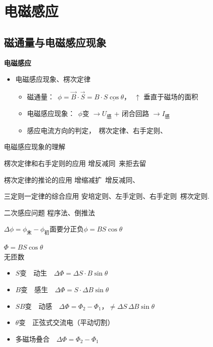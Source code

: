 \chapter{电磁感应}
\label{ch:12}

\section{磁通量与电磁感应现象}
\textbf{电磁感应}

\begin{itemize}
\item 电磁感应现象、楞次定律
 \begin{itemize}
 \item 磁通量：\ $\phi=\vec B\cdot\vec S=B\cdot\underline{S\cos\theta}$，\ $\uparrow$ 垂直于磁场的面积
 \item 电磁感应现象：\ $\phi$变 $\to U_{\text{感}}$ + 闭合回路 $\to I_{\text{感}}$
 \item 感应电流方向的判定，\ 楞次定律、右手定则、
 \end{itemize}
\end{itemize}

电磁感应现象的理解

楞次定律和右手定则的应用 \quad 增反减同\ 来拒去留

楞次定律的推论的应用 \quad 增缩减扩\ 增反减同、

三定则一定律的综合应用 \quad 安培定则、左手定则、右手定则\ 楞次定则.

二次感应问题 \quad 程序法、倒推法

$\Delta\phi=\phi_{\text{末}}-\phi_{\text{初}}$\qquad 面要分正负\qquad $\phi=BS\cos\theta$


\begin{center}
$\Phi=BS\cos\theta$\\
无匝数
\end{center}
\begin{itemize}
  \item $S$变　动生　$\Delta\Phi=\Delta S\cdot B\sin\theta$
  \item $B$变　感生　$\Delta\Phi=S\cdot\Delta B\sin\theta$
  \item $SB$变　动感　$\Delta\Phi=\Phi_2-\Phi_1$，$\ne\Delta S\,\Delta B\sin\theta$
  \item $\theta$变　正弦式交流电（平动切割）
  \item 多磁场叠合　$\Delta\Phi=\Phi_2-\Phi_1$
\end{itemize}

